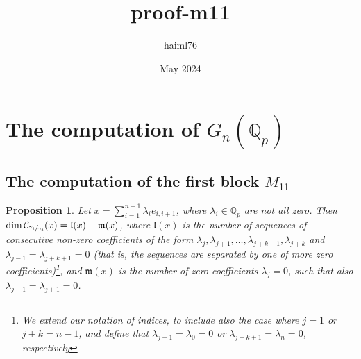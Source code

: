 \documentclass[12pt]{article}
\title{proof-m11}
\author{haiml76 }
\date{May 2024}
\newtheorem{proposition}[theorem]{Proposition}
\begin{document}
\section{The computation of $G_n(\mathbb{Q}_p)$}
\subsection{The computation of the first block $M_{11}$}
\begin{proposition}
\label{prop.centralizer.dimension}
Let $x=\sum_{i=1}^{n-1}\lambda_i e_{i,i+1}$, where $\lambda_i\in\mathbb{Q}_p$ are not all zero. Then $\dim\mathcal{C}_{\sfrac{\gamma_1}{\gamma_3}}(x)=\mathfrak{l}(x)+\mathfrak{m}(x)$, where $\mathfrak{l}(x)$ is the number of sequences of consecutive non-zero coefficients of the form $\lambda_j,\lambda_{j+1},\dots,\lambda_{j+k-1},\lambda_{j+k}$ and $\lambda_{j-1}=\lambda_{j+k+1}=0$ (that is, the sequences are separated by one of more zero coefficients)\footnote{We extend our notation of indices, to include also the case where $j=1$ or $j+k=n-1$, and define that $\lambda_{j-1}=\lambda_0=0$ or $\lambda_{j+k+1}=\lambda_n=0$, respectively}, and $\mathfrak{m}(x)$ is the number of zero coefficients $\lambda_j=0$, such that also $\lambda_{j-1}=\lambda_{j+1}=0$.
\end{proposition}
\end{document}

